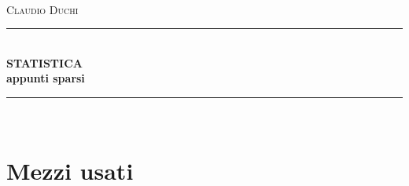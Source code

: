 \documentclass[a4paper,oneside]{book}%
\date{\datetime}
\newcommand{\HRule}{\rule{\linewidth}{0.5mm}}
\begin{document}
\frontmatter
		\hypersetup{pageanchor=false}
\begin{titlepage}\parindent=0pt
	\centering
	\parbox{0.8\textwidth}{\centering
		\Lgrandedue\\[1cm]
		\textsc{\LARGE Claudio Duchi}\\[1.5cm]
		\HRule \\[0.4cm]
		{ \huge \bfseries STATISTICA}\\[0.4cm]
		{ \large \bfseries appunti sparsi}\\[0.4cm]
		\HRule \\[1.5cm]
		\vfill
		
	}
\end{titlepage}
\hypersetup{pageanchor=true}
\CDcopyright
	\listoffigures
	\listoftables

	\tableofcontents
	\mainmatter

\nocite{*}
\printbibliography
{}
	\printindex
	\appendix
	\chapter{Mezzi usati}
	\CDMezziUsati
\end{document}
